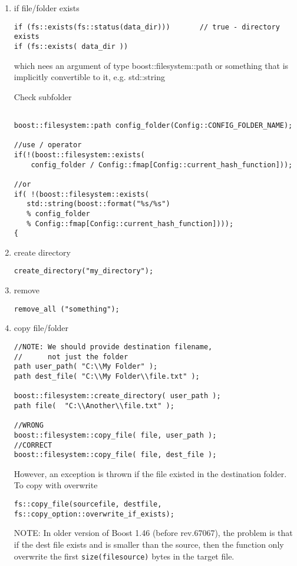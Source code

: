 \begin{enumerate}
  \item if file/folder exists
\begin{verbatim}
if (fs::exists(fs::status(data_dir)))       // true - directory exists
if (fs::exists( data_dir ))     
\end{verbatim}  
which nees an argument of type boost::filesystem::path or something that is
implicitly convertible to it, e.g. std::string

Check subfolder
\begin{verbatim}

boost::filesystem::path config_folder(Config::CONFIG_FOLDER_NAME);

//use / operator
if(!(boost::filesystem::exists(
    config_folder / Config::fmap[Config::current_hash_function]));

//or 
if( !(boost::filesystem::exists(
   std::string(boost::format("%s/%s") 
   % config_folder 
   % Config::fmap[Config::current_hash_function])));
{
\end{verbatim}

  \item create directory
\begin{verbatim}
create_directory("my_directory");
\end{verbatim}  
  \item remove
\begin{verbatim}
remove_all ("something");
\end{verbatim}

  \item copy file/folder
\begin{verbatim}
//NOTE: We should provide destination filename, 
//      not just the folder
path user_path( "C:\\My Folder" );
path dest_file( "C:\\My Folder\\file.txt" );

boost::filesystem::create_directory( user_path );
path file(  "C:\\Another\\file.txt" );

//WRONG
boost::filesystem::copy_file( file, user_path );
//CORRECT
boost::filesystem::copy_file( file, dest_file );
\end{verbatim}  

However, an exception is thrown if the file existed in the destination folder.
To copy with overwrite
\begin{verbatim}
fs::copy_file(sourcefile, destfile, fs::copy_option::overwrite_if_exists);
\end{verbatim}
NOTE: In older version of Boost 1.46 (before rev.67067), the problem is that 
if the dest file exists and is smaller than the source, then the function only
overwrite the first \verb!size(filesource)! bytes in the target file.


\end{enumerate}
